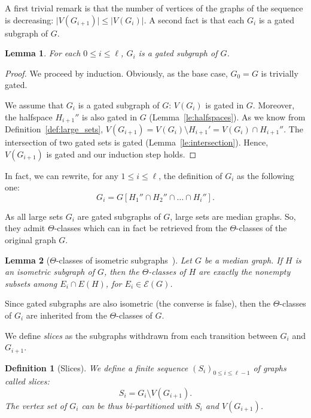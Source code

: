 \documentclass[11pt,letterpaper]{article}
\newtheorem{lemma}{Lemma}
\newtheorem{definition}{Definition}
\begin{document}
A first trivial remark is that the number of vertices of the graphs of the sequence is decreasing: $\vert V(G_{i+1}) \vert \le \vert V(G_i) \vert$. A second fact is that each $G_i$ is a gated subgraph of $G$.

\begin{lemma}
For each $0\le i\le \ell$, $G_i$ is a gated subgraph of $G$.
\label{le:gated_large}
\end{lemma}
\begin{proof}
We proceed by induction. Obviously, as the base case, $G_0 = G$ is trivially gated. 

We assume that $G_i$ is a gated subgraph of $G$: $V(G_i)$ is gated in $G$. Moreover, the halfspace $H_{i+1}''$ is also gated in $G$ (Lemma~\ref{le:halfspaces}). As we know from Definition~\ref{def:large_sets}, $V(G_{i+1}) = V(G_i) \setminus H_{i+1}' = V(G_i) \cap H_{i+1}''$. The intersection of two gated sets is gated (Lemma~\ref{le:intersection}). Hence, $V(G_{i+1})$ is gated and our induction step holds.
\end{proof}

In fact, we can rewrite, for any $1\le i\le \ell$, the definition of $G_i$ as the following one:
\begin{equation}
G_i = G[H_1'' \cap H_2'' \cap \ldots \cap H_i''].
\label{eq:large_sets}
\end{equation}

As all large sets $G_i$ are gated subgraphs of $G$, large sets are median graphs. So, they admit $\Theta$-classes which can in fact be retrieved from the $\Theta$-classes of the original graph $G$.

\begin{lemma}[$\Theta$-classes of isometric subgraphs~\cite{BeDuHa22}]
Let $G$ be a median graph. If $H$ is an isometric subgraph of $G$, then the $\Theta$-classes of $H$ are exactly the nonempty subsets among $E_i \cap E(H)$, for $E_i \in \mathcal{E}(G)$.
\label{le:isometric}
\end{lemma}

Since gated subgraphs are also isometric (the converse is false), then the $\Theta$-classes of $G_i$ are inherited from the $\Theta$-classes of $G$. 

We define \textit{slices} as the subgraphs withdrawn from each transition between $G_i$ and $G_{i+1}$.

\begin{definition}[Slices]
We define a finite sequence $(S_i)_{0\le i\le \ell - 1}$ of graphs called {\em slices}:
$$S_i = G_i \setminus V(G_{i+1}).$$
The vertex set of $G_i$ can be thus bi-partitioned with $S_i$ and $V(G_{i+1})$.
\label{def:corner}
\end{definition}
\end{document}

